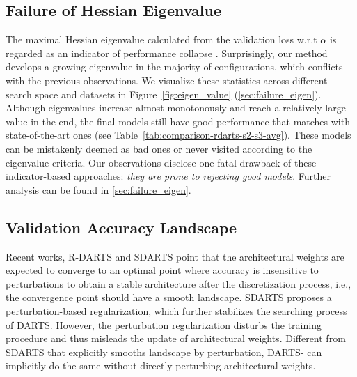 \documentclass{article} \usepackage{iclr2021_conference,times}
\begin{document}
\subsection{Failure of Hessian Eigenvalue}\label{sec:failure of eigen}
The maximal Hessian eigenvalue calculated from the validation loss w.r.t $\alpha$ is regarded as an indicator of performance collapse \citep{zela2020understanding,chen2020stabilizing}.  Surprisingly, our method develops a growing eigenvalue in the majority of configurations, which conflicts with the previous observations. We visualize these statistics across different search space and datasets in Figure~\ref{fig:eigen_value} (\ref{sec:failure_eigen}).  Although eigenvalues increase almost monotonously and reach a relatively large value in the end, the final models still have good performance that matches with state-of-the-art ones (see Table~\ref{tab:comparison-rdarts-s2-s3-avg}). 
These models can be mistakenly deemed as bad ones or never visited according to the eigenvalue criteria. Our observations disclose one fatal drawback of these indicator-based approaches: \emph{they are prone to rejecting good models}. Further analysis can be found in \ref{sec:failure_eigen}.






\subsection{Validation Accuracy Landscape}

Recent works, R-DARTS \citep{zela2020understanding} and SDARTS \citep{chen2020stabilizing} point that the architectural weights are expected to converge to an optimal point where accuracy is insensitive to perturbations to obtain a stable architecture after the discretization process, i.e., the convergence point should have a smooth landscape. SDARTS  proposes a perturbation-based regularization, which further stabilizes the searching process of DARTS. However, the perturbation regularization disturbs the training procedure and thus misleads the update of architectural weights. 
Different from SDARTS that explicitly smooths landscape by perturbation, DARTS- can implicitly do the same without directly perturbing architectural weights.
\end{document}
